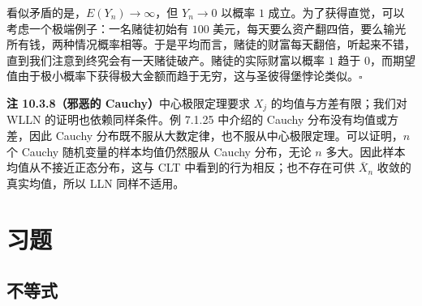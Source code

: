 \documentclass[UTF8,12pt,a4paper,fontset=fandol]{ctexart}
\begin{document}
看似矛盾的是，$E(Y_n)\to\infty$，但 $Y_n\to 0$ 以概率 $1$ 成立。为了获得直觉，可以考虑一个极端例子：一名赌徒初始有 $100$ 美元，每天要么资产翻四倍，要么输光所有钱，两种情况概率相等。于是平均而言，赌徒的财富每天翻倍，听起来不错，直到我们注意到终究会有一天赌徒破产。赌徒的实际财富以概率 $1$ 趋于 $0$，而期望值由于极小概率下获得极大金额而趋于无穷，这与圣彼得堡悖论类似。$\square$

\noindent\textbf{注 10.3.8（邪恶的 Cauchy）}\quad 中心极限定理要求 $X_j$ 的均值与方差有限；我们对 WLLN 的证明也依赖同样条件。例 7.1.25 中介绍的 Cauchy 分布没有均值或方差，因此 Cauchy 分布既不服从大数定律，也不服从中心极限定理。可以证明，$n$ 个 Cauchy 随机变量的样本均值仍然服从 Cauchy 分布，无论 $n$ 多大。因此样本均值从不接近正态分布，这与 CLT 中看到的行为相反；也不存在可供 $\bar X_n$ 收敛的真实均值，所以 LLN 同样不适用。

\section*{习题}

\subsection*{不等式}
\end{document}
